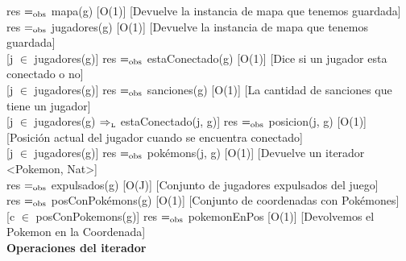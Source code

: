 
{res $=_{\mathrm{obs}}$ mapa(g)}
[O(1)]
[Devuelve la instancia de mapa que tenemos guardada]
\\

{res $=_{\mathrm{obs}}$ jugadores(g)}
[O(1)]
[Devuelve la instancia de mapa que tenemos guardada]
\\

[j $\in$ jugadores(g)]
{res $=_{\mathrm{obs}}$ estaConectado(g)}
[O(1)]
[Dice si un jugador esta conectado o no]
\\

[j $\in$ jugadores(g)]
{res $=_{\mathrm{obs}}$ sanciones(g)}
[O(1)]
[La cantidad de sanciones que tiene un jugador]
\\

[j $\in$ jugadores(g) $\Rightarrow_{\mathrm{\scriptscriptstyle{L}}}$ estaConectado(j, g)]
{res $=_{\mathrm{obs}}$ posicion(j, g)}
[O(1)]
[Posici\'on actual del jugador cuando se encuentra conectado]
\\

[j $\in$ jugadores(g)]
{res $=_{\mathrm{obs}}$ pok\'emons(j, g)}
[O(1)]
[Devuelve un iterador <Pokemon, Nat>]
\\

{res $=_{\mathrm{obs}}$ expulsados(g)}
[O(J)]
[Conjunto de jugadores expulsados del juego]
\\

{res $=_{\mathrm{obs}}$ posConPok\'emons(g)}
[O(1)]
[Conjunto de coordenadas con Pok\'emones]
\\

[c $\in$ posConPokemons(g)]
{res $=_{\mathrm{obs}}$ pokemonEnPos}
[O(1)]
[Devolvemos el Pokemon en la Coordenada]
\\




%


\bf{Operaciones del iterador}\\

